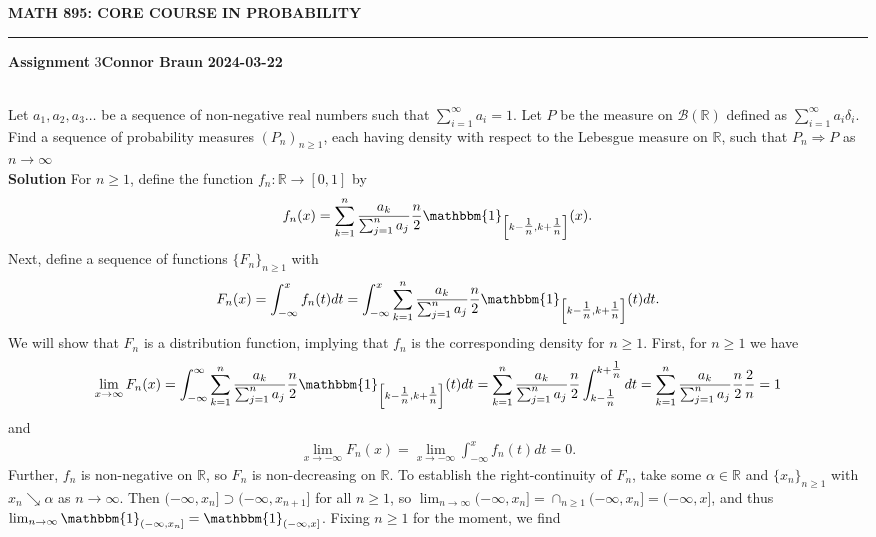 \documentclass[10pt]{article}
\newcommand{\mbb}[1]{\mathbb{#1}}
\newcommand{\1}[1]{\mathbbm{1}_{#1}}
\newcommand{\mc}[1]{\mathcal{#1}}
\begin{document}
    \begin{center}
        {\bf\large{MATH 895: CORE COURSE IN PROBABILITY}}
        \smallskip
        \hrule
        \smallskip
        {\bf Assignment} 3\hfill {\bf Connor Braun} \hfill {\bf 2024-03-22}
    \end{center}
    \\[5pt]
    Let $a_1,a_2,a_3\dots$ be a sequence of non-negative real numbers such that $\sum_{i=1}^\infty a_i=1$. Let $P$ be the measure on $\mc{B}(\mbb{R})$ defined as $\sum_{i=1}^\infty a_i\delta_i$. Find a sequence of probability measures $(P_n)_{n\geq 1}$, each having density
    with respect to the Lebesgue measure on $\mbb{R}$, such that $P_n\Longrightarrow P$ as $n\rightarrow\infty$\\[5pt]
    {\bf Solution}\hspace{5pt} For $n\geq 1$, define the function $f_n:\mbb{R}\rightarrow[0,1]$ by
    \begin{align*}
        f_n(x)=\sum_{k=1}^n\frac{a_k}{\sum_{j=1}^na_j}\frac{n}{2}\1{\left[k-\tfrac{1}{n},k+\tfrac{1}{n}\right]}(x).
    \end{align*}
    Next, define a sequence of functions $\{F_n\}_{n\geq 1}$ with
    \begin{align*}
        F_n(x)=\int_{-\infty}^xf_n(t)dt=\int_{-\infty}^x\sum_{k=1}^n\frac{a_k}{\sum_{j=1}^na_j}\frac{n}{2}\1{\left[k-\tfrac{1}{n},k+\tfrac{1}{n}\right]}(t)dt.
    \end{align*}
    We will show that $F_n$ is a distribution function, implying that $f_n$ is the corresponding density for $n\geq 1$. First, for $n\geq 1$ we have
    \begin{align*}
        \lim_{x\rightarrow\infty}F_n(x)=\int_{-\infty}^\infty\sum_{k=1}^n\frac{a_k}{\sum_{j=1}^na_j}\frac{n}{2}\1{\left[k-\tfrac{1}{n},k+\tfrac{1}{n}\right]}(t)dt=\sum_{k=1}^n\frac{a_k}{\sum_{j=1}^na_j}\frac{n}{2}\int_{k-\tfrac{1}{n}}^{k+\tfrac{1}{n}}dt=\sum_{k=1}^n\frac{a_k}{\sum_{j=1}^na_j}\frac{n}{2}\frac{2}{n}=1
    \end{align*}
    and
    \begin{align*}
        \lim_{x\rightarrow-\infty}F_n(x)=\lim_{x\rightarrow-\infty}\int_{-\infty}^xf_n(t)dt=0.
    \end{align*}
    Further, $f_n$ is non-negative on $\mbb{R}$, so $F_n$ is non-decreasing on $\mbb{R}$. To establish the right-continuity of $F_n$, take some $\alpha\in\mbb{R}$ and $\{x_n\}_{n\geq 1}$ with $x_n\searrow\alpha$ as $n\rightarrow\infty$. Then $(-\infty,x_n]\supset(-\infty,x_{n+1}]$ for all $n\geq 1$, so $\lim_{n\rightarrow\infty}(-\infty,x_n]=\cap_{n\geq 1}(-\infty,x_n]=(-\infty,x]$, and thus $\lim_{n\rightarrow\infty}\1{(-\infty,x_n]}=\1{(-\infty,x]}$. Fixing $n\geq 1$ for the moment, we find
\end{document}
